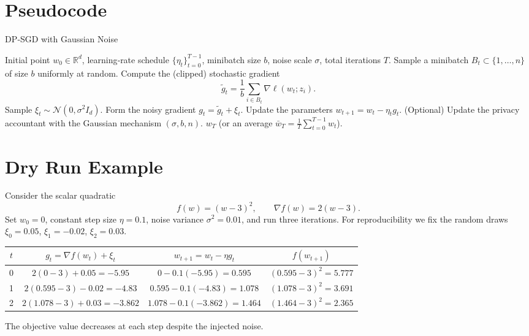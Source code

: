 \documentclass{article}
\newcommand{\R}{\mathbb{R}}
\begin{document}
\section*{Pseudocode}
\begin{algorithm}[H]
\caption{DP‑SGD with Gaussian Noise}
\label{alg:dp-sgd}
\begin{algorithmic}[1]
\REQUIRE Initial point $w_0\in\R^{d}$, learning‑rate schedule $\{\eta_t\}_{t=0}^{T-1}$,
 minibatch size $b$, noise scale $\sigma$, total iterations $T$.
    \STATE Sample a minibatch $B_t\subset\{1,\dots,n\}$ of size $b$ uniformly at random.
    \STATE Compute the (clipped) stochastic gradient 
    \[
    \tilde g_t=\frac{1}{b}\sum_{i\in B_t}\nabla\ell(w_t;z_i).
    \]
    \STATE Sample $\xi_t\sim\mathcal N(0,\sigma^2 I_d)$.
    \STATE Form the noisy gradient $g_t=\tilde g_t+\xi_t$.
    \STATE Update the parameters $w_{t+1}=w_t-\eta_t g_t$.
    \STATE (Optional) Update the privacy accountant with the Gaussian
            mechanism $(\sigma,b,n)$.
\ENDFOR
\RETURN $w_T$ (or an average $\bar w_T = \frac1T\sum_{t=0}^{T-1}w_t$).
\end{algorithmic}
\end{algorithm}

\section*{Dry Run Example}
Consider the scalar quadratic
\[
f(w)=(w-3)^2,\qquad \nabla f(w)=2(w-3).
\]
Set $w_0=0$, constant step size $\eta=0.1$, noise variance $\sigma^2=0.01$,
and run three iterations.  For reproducibility we fix the random draws
$\xi_0=0.05$, $\xi_1=-0.02$, $\xi_2=0.03$.

\begin{center}
\begin{tabular}{c|c|c|c}
$t$ & $g_t=\nabla f(w_t)+\xi_t$ & $w_{t+1}=w_t-\eta g_t$ & $f(w_{t+1})$ \\ \hline
0 & $2(0-3)+0.05=-5.95$ & $0-0.1(-5.95)=0.595$ & $(0.595-3)^2=5.777$ \\
1 & $2(0.595-3)-0.02=-4.83$ & $0.595-0.1(-4.83)=1.078$ & $(1.078-3)^2=3.691$ \\
2 & $2(1.078-3)+0.03=-3.862$ & $1.078-0.1(-3.862)=1.464$ & $(1.464-3)^2=2.365$
\end{tabular}
\end{center}
The objective value decreases at each step despite the injected noise.
\end{document}
